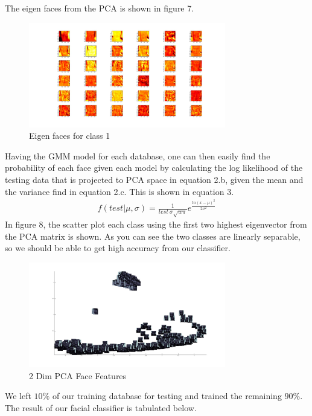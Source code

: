 \documentclass{article}
\begin{document}
\centerline{}
The eigen faces from the PCA is shown in figure 7. 
\begin{figure}[htb]
\begin{minipage}[b]{0.98\linewidth}
\centerline{\includegraphics[width=8.60cm]{eigen_face.jpg}}
\end{minipage}
\caption{Eigen faces for class 1}
\label{fig:res}
\end{figure}
Having the GMM model for each database, one can then easily find the probability of each face given each model by calculating the log likelihood of the testing data that is projected to PCA space in equation 2.b, given the mean and the variance find in equation 2.c. This is shown in equation 3. 
\begin{align}
f(test|\mu,\sigma) = \frac{1}{test\ \sigma\sqrt{w\pi}}e^\frac{ln(x-\mu)^2}{2\sigma^2}
\end{align}
In figure 8, the scatter plot each class using the first two highest eigenvector from the PCA matrix is shown. As you can see the two classes are linearly separable, so we should be able to get high accuracy from our classifier. 
\begin{figure}[htb]
\begin{minipage}[b]{0.88\linewidth}
\centerline{\includegraphics[width=8.60cm]{scatter_face.jpg}}
\end{minipage}
\caption{2 Dim PCA Face Features}
\label{fig:res}
\end{figure}
We left $10\%$ of our training database for testing and trained the remaining $90\%$. The result of our facial classifier is tabulated below. \\
\end{document}
